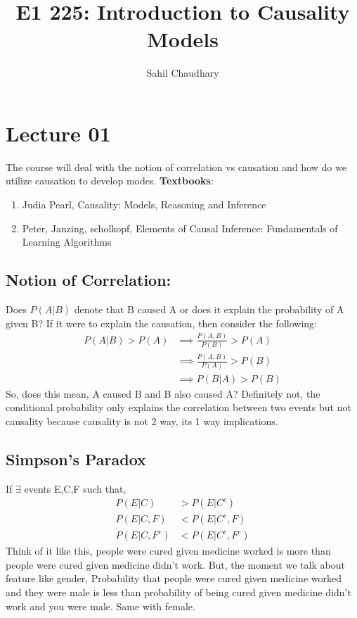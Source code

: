 \documentclass{article}
\title{E1 225: Introduction to Causality Models}
\author{Sahil Chaudhary}
\begin{document}
    \maketitle
    \section{Lecture 01}
    The course will deal with the notion of correlation vs causation and how do we utilize causation to develop modes.
    \textbf{Textbooks}:
    \begin{enumerate}
        \item Judia Pearl, Causality: Models, Reasoning and Inference
        \item Peter, Janzing, scholkopf, Elements of Causal Inference: Fundamentals of Learning Algorithms
    \end{enumerate}
    \subsection{Notion of Correlation:}
    Does $P(A|B)$ denote that B caused A or does it explain the probability of A given B?
    If it were to explain the causation, then consider the following:
    \begin{align*}
        P(A|B) > P(A)  &\implies \frac{P(A,B)}{P(B)}>P(A)\\
        &\implies \frac{P(A,B)}{P(A)}>P(B)\\
        &\implies P(B|A) > P(B)
    \end{align*}
    So, does this mean, A caused B and B also caused A? Definitely not, the conditional probability only explains the correlation between two events but not causality because causality is not 2 way, its 1 way implications.

    \subsection{Simpson's Paradox}
    If $\exists$ events E,C,F such that,
    \begin{align}
        P(E|C) &> P(E|C^c)\\
        P(E|C,F) &< P(E|C^c,F)\\
        P(E|C,F^c) &< P(E|C^c,F^c)
    \end{align}
    Think of it like this, people were cured given medicine worked is more than people were cured given medicine didn't work.
    But, the moment we talk about feature like gender,
    Probability that people were cured given medicine worked and they were male is less than probability of being cured given medicine didn't work and you were male. Same with female. 
    
\end{document}
